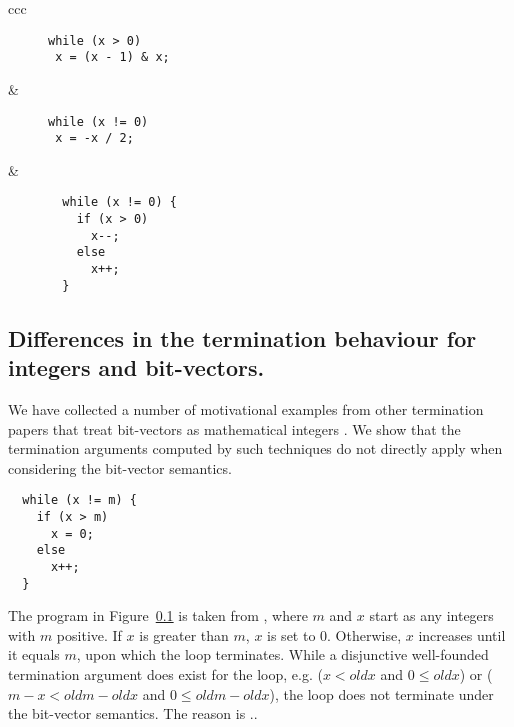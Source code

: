 \documentclass[preprint]{sigplanconf}
\theoremstyle{definition}
\begin{document}
\begin{figure*}
\centering
 \begin{tabular}{ccc}

\begin{subfigure}[b]{0.3\textwidth}
\begin{lstlisting}
while (x > 0)
 x = (x - 1) & x;
\end{lstlisting}
\caption{}
 \label{fig:motivation.a}
\end{subfigure}%

&

\begin{subfigure}[b]{0.3\textwidth}
\begin{lstlisting}
while (x != 0)
 x = -x / 2;
\end{lstlisting}
\caption{}
 \label{fig:motivation.b}
\end{subfigure}%

&

\begin{subfigure}[b]{0.3\textwidth}
\begin{lstlisting}
  while (x != 0) {
    if (x > 0)
      x--;
    else
      x++;
  }
\end{lstlisting}
\caption{}
 \label{fig:motivation.c}
\end{subfigure}%

\end{tabular}
\end{figure*}

\subsection{Differences in the termination behaviour for integers and bit-vectors.}
We have collected a number of motivational examples from other termination papers that treat bit-vectors as mathematical integers \cite{DBLP:conf/tacas/LeikeH14,DBLP:conf/tacas/CookSZ13}. 
We show that the termination arguments computed by such techniques do not directly apply when considering the bit-vector semantics.

\begin{lstlisting}
  while (x != m) {
    if (x > m)
      x = 0;
    else
      x++;
  }
\end{lstlisting}

The program in Figure~\ref{} is taken from \cite{DBLP:conf/tacas/CookSZ13}, where
$m$ and $x$ start as any integers with $m$ positive. If $x$ is greater than
$m$, $x$ is set to 0. Otherwise, $x$ increases until it equals $m$, upon which
the loop terminates. While a disjunctive well-founded termination argument does exist for the loop, 
e.g. ($x < oldx$ and $0 \leq oldx$) or ($m-x < oldm-oldx$ and $0 \leq oldm-oldx$), the loop does not 
terminate under the bit-vector semantics. The reason is ..
\end{document}
